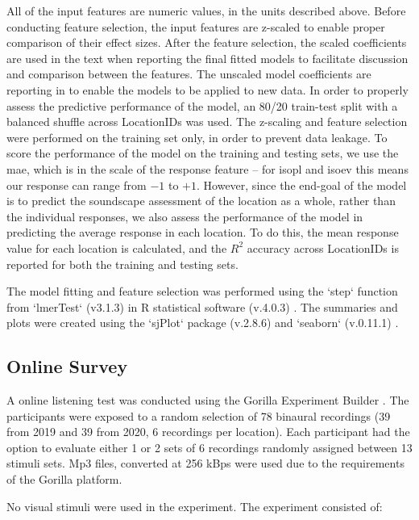    All of the input features are numeric values, in the units described above. Before conducting feature selection, the input features are z-scaled to enable proper comparison of their effect sizes. After the feature selection, the scaled coefficients are used in the text when reporting the final fitted models to facilitate discussion and comparison between the features. The unscaled model coefficients are reporting in  to enable the models to be applied to new data. In order to properly assess the predictive performance of the model, an 80/20 train-test split with a balanced shuffle across LocationIDs was used. The z-scaling and feature selection were performed on the training set only, in order to prevent data leakage. To score the performance of the model on the training and testing sets, we use the \gls{mae}, which is in the scale of the response feature -- for \gls{isopl} and \gls{isoev} this means our response can range from $-1$ to $+1$. However, since the end-goal of the model is to predict the soundscape assessment of the location as a whole, rather than the individual responses, we also assess the performance of the model in predicting the average response in each location. To do this, the mean response value for each location is calculated, and the $R^2$ accuracy across LocationIDs is reported for both the training and testing sets.

   The model fitting and feature selection was performed using the `step` function from `lmerTest` (v3.1.3) \citep{Kuznetsova2017lmerTest} in R statistical software (v.4.0.3) \citep{RCT2021R}. The summaries and plots were created using the `sjPlot` package (v.2.8.6) \citep{Luedecke2021sjPlot} and `seaborn` (v.0.11.1) \citep{Waskom2021seaborn}.

 \subsection{Online Survey}

   A online listening test was conducted using the Gorilla Experiment Builder \href{www.275gorilla.sc}{} \citep{AnwylIrvine2020Gorilla}. The participants were exposed to a random selection of 78 binaural recordings (39 from 2019 and 39 from 2020, 6 recordings per location). Each participant had the option to evaluate either 1 or 2 sets of 6 recordings randomly assigned between 13 stimuli sets. Mp3 files, converted at 256 kBps were used due to the requirements of the Gorilla platform.

   No visual stimuli were used in the experiment. The experiment consisted of:

